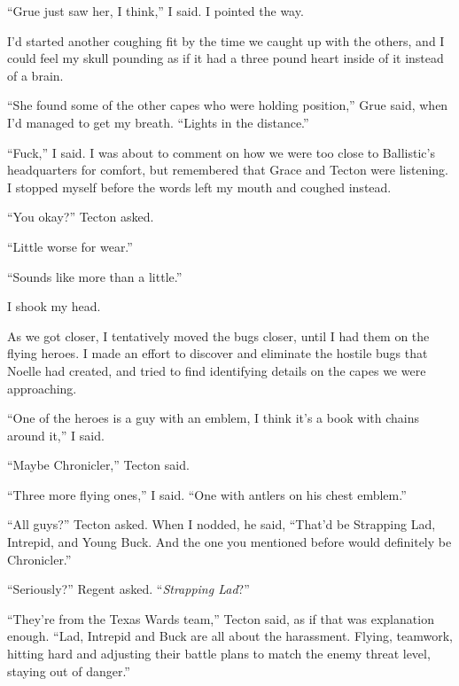 ``Grue just saw her, I think,'' I said.  I pointed the way.



I'd started another coughing fit by the time we caught up with the others, and I could feel my skull pounding as if it had a three pound heart inside of it instead of a brain.



``She found some of the other capes who were holding position,'' Grue said, when I'd managed to get my breath.  ``Lights in the distance.''



``Fuck,'' I said.  I was about to comment on how we were too close to Ballistic's headquarters for comfort, but remembered that Grace and Tecton were listening.  I stopped myself before the words left my mouth and coughed instead.



``You okay?'' Tecton asked.



``Little worse for wear.''



``Sounds like more than a little.''



I shook my head.



As we got closer, I tentatively moved the bugs closer, until I had them on the flying heroes.  I made an effort to discover and eliminate the hostile bugs that Noelle had created, and tried to find identifying details on the capes we were approaching.



``One of the heroes is a guy with an emblem, I think it's a book with chains around it,'' I said.



``Maybe Chronicler,'' Tecton said.



``Three more flying ones,'' I said.  ``One with antlers on his chest emblem.''



``All guys?'' Tecton asked.  When I nodded, he said, ``That'd be Strapping Lad, Intrepid, and Young Buck.  And the one you mentioned before would definitely be Chronicler.''



``Seriously?'' Regent asked.  ``\emph{Strapping Lad}?''



``They're from the Texas Wards team,'' Tecton said, as if that was explanation enough.  ``Lad, Intrepid and Buck are all about the harassment.  Flying, teamwork, hitting hard and adjusting their battle plans to match the enemy threat level, staying out of danger.''



